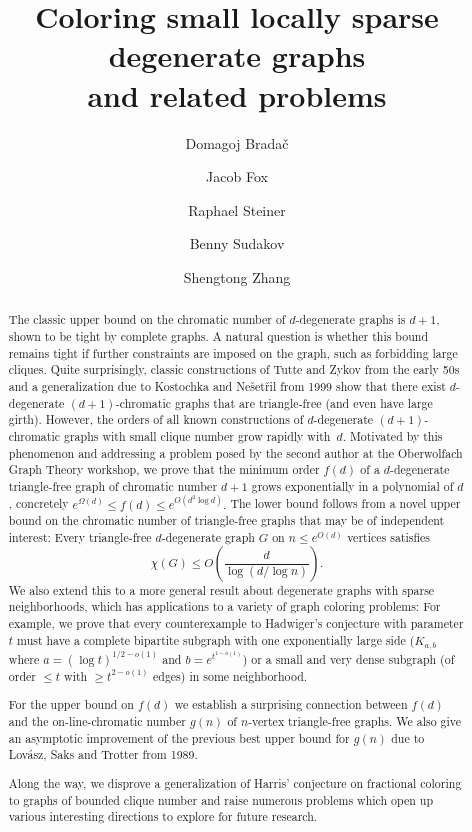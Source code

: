 \documentclass[10pt]{amsart}
\title[Coloring small locally sparse degenerate graphs]{Coloring small locally sparse degenerate graphs \\ and related problems}
\author
{
Domagoj Brada\v{c}
}
\author{Jacob Fox}
\author 
{
Raphael Steiner
}
\author
{
Benny Sudakov 
}\thanks{The fourth author gratefully acknowledges funding from the SNSF Grant 200021-228014. }
\author{
Shengtong Zhang
}
\date{}
\theoremstyle{definition}
\begin{document}

\begin{abstract}
    \setlength{\parskip}{\smallskipamount}
    \setlength{\parindent}{0pt}
    \noindent
The classic upper bound on the chromatic number of $d$-degenerate graphs is $d+1$, shown to be tight by complete graphs. A natural question is whether this bound remains tight if further constraints are imposed on the graph, such as forbidding large cliques. Quite surprisingly, classic constructions of Tutte and Zykov from the early 50s and a generalization due to Kostochka and Ne\v{s}et\v{r}il from 1999 show that there exist $d$-degenerate $(d+1)$-chromatic graphs that are triangle-free (and even have large girth). However, the orders of all known constructions of $d$-degenerate $(d+1)$-chromatic graphs with small clique number grow rapidly with~$d$. Motivated by this phenomenon and addressing a problem posed by the second author at the Oberwolfach Graph Theory workshop,
we prove that the minimum order $f(d)$ of a $d$-degenerate triangle-free graph of chromatic number $d+1$ grows exponentially in a polynomial of $d$, concretely $e^{\Omega(d)}\le f(d)\le e^{O(d^2\log d)}.$ The lower bound follows from a novel upper bound on the chromatic number of triangle-free graphs that may be of independent interest: Every triangle-free $d$-degenerate graph $G$ on $n \le e^{O(d)}$ vertices satisfies $$\chi(G)\le O\left(\frac{d}{\log\left(d/\log n\right)}\right).$$ We also extend this to a more general result about degenerate graphs with sparse neighborhoods, which has applications to a variety of graph coloring problems: For example, we prove that every counterexample to Hadwiger's conjecture with parameter $t$ must have a complete bipartite subgraph with one exponentially large side ($K_{a,b}$ where $a=(\log t)^{1/2-o(1)}$ and $b=e^{t^{1-o(1)}}$) or a small and very dense subgraph (of order $\le t$ with $\ge t^{2-o(1)}$ edges) in some neighborhood.

For the upper bound on $f(d)$ we establish a surprising connection between $f(d)$ and the on-line-chromatic number $g(n)$ of $n$-vertex triangle-free graphs. We also give an asymptotic improvement of the previous best upper bound for $g(n)$ due to Lov\'{a}sz, Saks and Trotter from 1989.

Along the way, we disprove a generalization of Harris' conjecture on fractional coloring to graphs of bounded clique number and raise numerous problems which open up various interesting directions to explore for future research.
\end{abstract}
\end{document}
